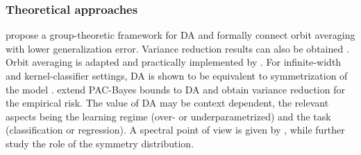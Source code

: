 \documentclass[mathematics,review,submit,moreauthors]{Definitions/mdpi}
\begin{document}
\subsubsection{Theoretical approaches}
\citet{chen2020} propose a group-theoretic framework for DA and formally connect orbit averaging with lower generalization error.
Variance reduction results can also be obtained \citep{chen2020,dao2019p3icml}.
Orbit averaging is adapted and practically implemented by \citet{benton2020anips}.
For infinite-width and kernel-classifier settings, DA is shown to be equivalent to symmetrization of the model \citep{maass2024,dao2019p3icml}.
\citet{lyle2020} extend PAC-Bayes bounds to DA and obtain variance reduction for the empirical risk.
The value of DA may be context dependent, the relevant aspects being the learning regime (over- or underparametrized) and the task (classification or regression).
A spectral point of view is given by \citet{lin2024}, while \citet{lawrence2026} further study the role of the symmetry distribution.
\end{document}

